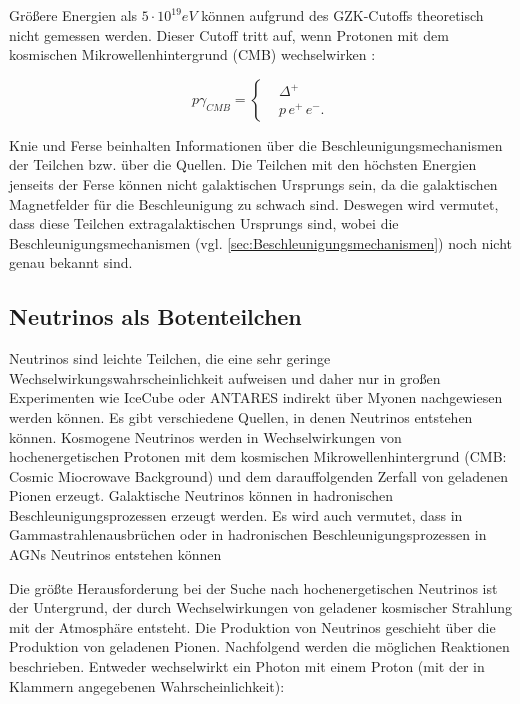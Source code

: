 Größere Energien als $5\cdot10^{19} \si{eV}$ können aufgrund des GZK-Cutoffs \cite{Greisen}\cite{ZatsepinKuzmin} theoretisch nicht gemessen werden. 
Dieser Cutoff tritt auf, wenn Protonen mit dem kosmischen Mikrowellenhintergrund (CMB) wechselwirken \cite{Greisen}\cite{ZatsepinKuzmin}: 

\begin{equation*}
p\gamma_{CMB}=	
\left\{
\begin{aligned}
& \Delta^+ \\
& p\, e^+ \, e^- .
\end{aligned}
\right.
\end{equation*}

Knie und Ferse beinhalten Informationen über die Beschleunigungsmechanismen der Teilchen bzw. über die Quellen.
Die Teilchen mit den höchsten Energien jenseits der Ferse können nicht galaktischen Ursprungs sein, da die galaktischen Magnetfelder für die Beschleunigung zu schwach sind. 
Deswegen wird vermutet, dass diese Teilchen extragalaktischen Ursprungs sind, wobei die Beschleunigungsmechanismen (vgl. \autoref{sec:Beschleunigungsmechanismen}) noch nicht genau bekannt sind.

\subsection{Neutrinos als Botenteilchen}
Neutrinos sind leichte Teilchen, die eine sehr geringe Wechselwirkungswahrscheinlichkeit aufweisen und daher nur in großen Experimenten wie IceCube\cite{Icecube} oder ANTARES\cite{ANTARES} indirekt über Myonen nachgewiesen werden können.
Es gibt verschiedene Quellen, in denen Neutrinos entstehen können.
Kosmogene Neutrinos werden in Wechselwirkungen von hochenergetischen Protonen mit dem kosmischen Mikrowellenhintergrund (CMB: Cosmic Miocrowave Background) und dem darauffolgenden Zerfall von geladenen Pionen erzeugt.
Galaktische Neutrinos können in hadronischen Beschleunigungsprozessen erzeugt werden.
Es wird auch vermutet, dass in Gammastrahlenausbrüchen oder in hadronischen Beschleunigungsprozessen in AGNs Neutrinos entstehen können

Die größte Herausforderung bei der Suche nach hochenergetischen Neutrinos ist der Untergrund, der durch Wechselwirkungen von geladener kosmischer Strahlung mit der Atmosphäre entsteht.
Die Produktion von Neutrinos geschieht über die Produktion von geladenen Pionen.
Nachfolgend werden die möglichen Reaktionen beschrieben.
Entweder wechselwirkt ein Photon mit einem Proton (mit der in Klammern angegebenen Wahrscheinlichkeit)\cite{DissBecker}:

